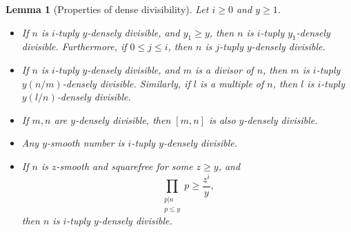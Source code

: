 \documentclass[12pt,a4paper,reqno]{amsart}
\numberwithin{equation}{section}
\theoremstyle{plain}
\newtheorem{lemma}[theorem]{Lemma}
\theoremstyle{definition}
\newtheorem{example}[theorem]{Example}
\begin{document}

\begin{lemma}[Properties of dense divisibility]\label{fq} Let $i \geq
  0$ and $y \geq 1$.
\begin{itemize}
\item[(0)] If $n$ is $i$-tuply $y$-densely divisible, and $y_1\geq y$,
  then $n$ is $i$-tuply $y_1$-densely divisible. Furthermore, if
  $0\leq j\leq i$, then $n$ is $j$-tuply $y$-densely divisible.
\item[(i)] If $n$ is $i$-tuply $y$-densely divisible, and $m$ is a
  divisor of $n$, then $m$ is $i$-tuply $y (n/m)$-densely
  divisible. Similarly, if $l$ is a multiple of $n$, then $l$ is
  $i$-tuply $y (l/n)$-densely divisible.
\item[(ii)] If $m,n$ are $y$-densely divisible, then $[m,n]$ is also $y$-densely divisible.
\item[(iii)] Any $y$-smooth number is $i$-tuply $y$-densely divisible.
\item[(iv)]  If $n$ is $z$-smooth and squarefree for some $z \geq y$,
  and 
\begin{equation}\label{eq-hyp-iv}
\prod_{\substack{p|n\\p \leq y}} p \geq \frac{z^i}{y},
\end{equation}
then $n$ is $i$-tuply $y$-densely divisible.  
\end{itemize}
\end{lemma}
\end{document}
